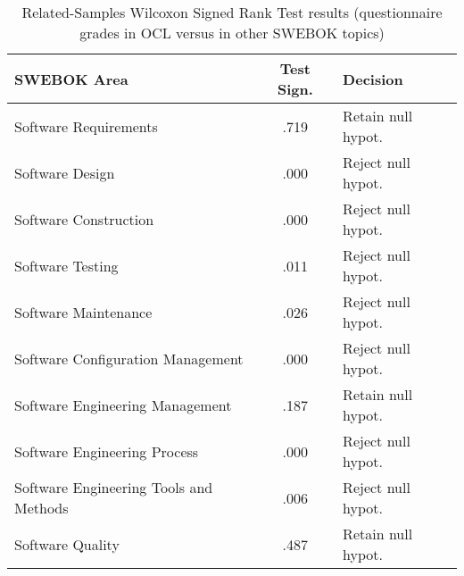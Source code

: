 \begin{table}[ht]
    \centering
    \begin{threeparttable}  
        \caption{Related-Samples Wilcoxon Signed Rank Test results (questionnaire grades in OCL versus in other SWEBOK topics)}
        
        \label{tbl:OCLvsSWEBOK}
        
        \begin{tabular}{@{}lcl@{}}
            \toprule
            
            SWEBOK Area & Test Sign. & Decision\\
            
            \midrule
            
            Software Requirements & .719 & Retain null hypot.\\
            
            Software Design & .000 & Reject null hypot.\\

            Software Construction & .000 & Reject null hypot.\\

            Software Testing & .011 & Reject null hypot.\\

            Software Maintenance & .026 & Reject null hypot.\\

                Software Configuration Management
            & .000 & Reject null hypot.\\

                Software Engineering Management
            & .187 & Retain null hypot.\\

            Software Engineering Process & .000 & Reject null hypot.\\

                Software Engineering Tools and Methods
            & .006 & Reject null hypot.\\
            
            Software Quality & .487 & Retain null hypot.\\

            \bottomrule
        
        \end{tabular}
        
    \end{threeparttable} 
\end{table}
